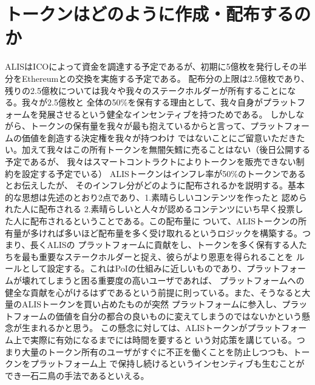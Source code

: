 \documentclass{jsarticle}
\begin{document}
\section{トークンはどのように作成・配布するのか}
ALISはICOによって資金を調達する予定であるが、初期に5億枚を発行しその半分をEthereumとの交換を実施する予定である。
配布分の上限は2.5億枚であり、残りの2.5億枚については我々や我々のステークホルダーが所有することになる。我々が2.5億枚と
全体の50\%を保有する理由として、我々自身がプラットフォームを発展させるという健全なインセンティブを持つためである。
しかしながら、トークンの保有量を我々が最も抱えているからと言って、プラットフォームの価値を創造する決定権を我々が持つわけ
ではないことにご留意いただきたい。加えて我々はこの所有トークンを無闇矢鱈に売ることはない（後日公開する予定であるが、
我々はスマートコントラクトによりトークンを販売できない制約を設定する予定でいる）
ALISトークンはインフレ率が50\%のトークンであるとお伝えしたが、
そのインフレ分がどのように配布されるかを説明する。基本的な思想は先述のとおり2点であり、1.素晴らしいコンテンツを作ったと
認められた人に配布される 2.素晴らしいと人々が認めるコンテンツにいち早く投票した人に配布されるということである。この配布量に
ついて、ALISトークンの所有量が多ければ多いほど配布量を多く受け取れるというロジックを構築する。つまり、長くALISの
プラットフォームに貢献をし、トークンを多く保有する人たちを最も重要なステークホルダーと捉え、彼らがより恩恵を得られることを
ルールとして設定する。これはPoIの仕組みに近しいものであり、プラットフォームが壊れてしまうと困る重要度の高いユーザであれば、
プラットフォームへの健全な貢献を心がけるはずであるという前提に則っている。また、そうなると大量のALISトークンを買い占めたものが突然
プラットフォームに参入し、プラットフォームの価値を自分の都合の良いものに変えてしまうのではないかという懸念が生まれるかと思う。
この懸念に対しては、ALISトークンがプラットフォーム上で実際に有効になるまでには時間を要すると
いう対応策を講じている。つまり大量のトークン所有のユーザがすぐに不正を働くことを防止しつつも、トークンをプラットフォーム上
で保持し続けるというインセンティブも生むことができ一石二鳥の手法であるといえる。
\end{document}

